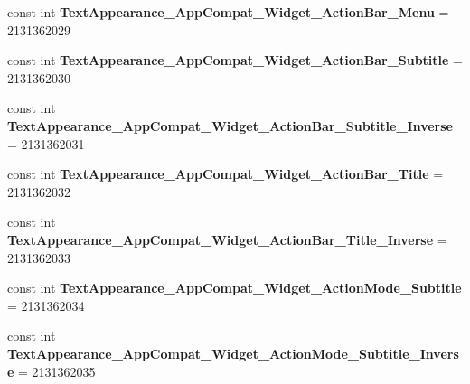 \begin{DoxyCompactItemize}
\item 
\mbox{\label{class_sample_app_1_1_droid_1_1_resource_1_1_style_a4a88d17234ca2897eb72a9b5a281fd97}} 
const int {\bfseries Text\+Appearance\+\_\+\+App\+Compat\+\_\+\+Widget\+\_\+\+Action\+Bar\+\_\+\+Menu} = 2131362029
\item 
\mbox{\label{class_sample_app_1_1_droid_1_1_resource_1_1_style_a16550dfd42cfc3c5f4b608248d821ecb}} 
const int {\bfseries Text\+Appearance\+\_\+\+App\+Compat\+\_\+\+Widget\+\_\+\+Action\+Bar\+\_\+\+Subtitle} = 2131362030
\item 
\mbox{\label{class_sample_app_1_1_droid_1_1_resource_1_1_style_acedfd43d3cecdce2878b285fc3449cbe}} 
const int {\bfseries Text\+Appearance\+\_\+\+App\+Compat\+\_\+\+Widget\+\_\+\+Action\+Bar\+\_\+\+Subtitle\+\_\+\+Inverse} = 2131362031
\item 
\mbox{\label{class_sample_app_1_1_droid_1_1_resource_1_1_style_aad2fff1c8720a73d65cc611a77885c86}} 
const int {\bfseries Text\+Appearance\+\_\+\+App\+Compat\+\_\+\+Widget\+\_\+\+Action\+Bar\+\_\+\+Title} = 2131362032
\item 
\mbox{\label{class_sample_app_1_1_droid_1_1_resource_1_1_style_afd0083b2e9b7409ab48e3976af1c4851}} 
const int {\bfseries Text\+Appearance\+\_\+\+App\+Compat\+\_\+\+Widget\+\_\+\+Action\+Bar\+\_\+\+Title\+\_\+\+Inverse} = 2131362033
\item 
\mbox{\label{class_sample_app_1_1_droid_1_1_resource_1_1_style_a0c7ca4b7ccf0c20894b8d34a466862dd}} 
const int {\bfseries Text\+Appearance\+\_\+\+App\+Compat\+\_\+\+Widget\+\_\+\+Action\+Mode\+\_\+\+Subtitle} = 2131362034
\item 
\mbox{\label{class_sample_app_1_1_droid_1_1_resource_1_1_style_ab8b6aca47ae2571ec443c6411d27acc3}} 
const int {\bfseries Text\+Appearance\+\_\+\+App\+Compat\+\_\+\+Widget\+\_\+\+Action\+Mode\+\_\+\+Subtitle\+\_\+\+Inverse} = 2131362035
\item 

\end{DoxyCompactItemize}

